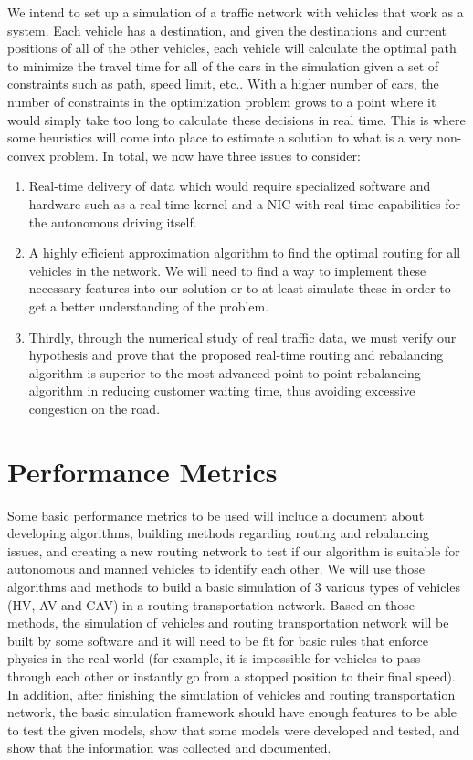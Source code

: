 \documentclass[10pt,letterpaper,draftclsnofoot,onecolumn]{IEEEtran}
\begin{document}
We intend to set up a simulation of a traffic network with vehicles that work as a system. Each vehicle has a destination, and given the destinations and current positions of all of the other vehicles, each vehicle will calculate the optimal path to minimize the travel time for all of the cars in the simulation given a set of constraints such as path, speed limit, etc.. With a higher number of cars, the number of constraints in the optimization problem grows to a point where it would simply take too long to calculate these decisions in real time. This is where some heuristics will come into place to estimate a solution to what is a very non-convex problem. In total, we now have three issues to consider:
\begin{enumerate}
\item Real-time delivery of data which would require specialized software and hardware such as a real-time kernel and a NIC with real time capabilities for the autonomous driving itself.
\item A highly efficient approximation algorithm to find the optimal routing for all vehicles in the network. We will need to find a way to implement these necessary features into our solution or to at least simulate these in order to get a better understanding of the problem.
\item Thirdly, through the numerical study of real traffic data, we must verify our hypothesis and prove that the proposed real-time routing and rebalancing algorithm is superior to the most advanced point-to-point rebalancing algorithm in reducing customer waiting time, thus avoiding excessive congestion on the road.
\end{enumerate}
\section{Performance Metrics}
Some basic performance metrics to be used will include a document about developing algorithms, building methods regarding routing and rebalancing issues, and creating a new routing network to test if our algorithm is suitable for autonomous and manned vehicles to identify each other. We will use those algorithms and methods to build a basic simulation of 3 various types of vehicles (HV, AV and CAV) in a routing transportation network. Based on those methods, the simulation of vehicles and routing transportation network will be built by some software and it will need to be fit for basic rules that enforce physics in the real world (for example, it is impossible for vehicles to pass through each other or instantly go from a stopped position to their final speed). In addition, after finishing the simulation of vehicles and routing transportation network, the basic simulation framework should have enough features to be able to test the given models, show that some models were developed and tested, and show that the information was collected and documented.
\end{document}
